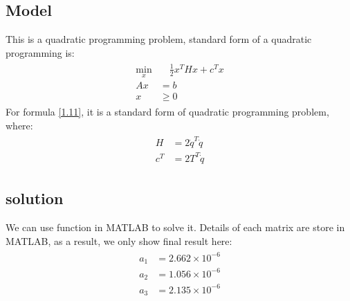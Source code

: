 \documentclass{article}
\begin{document}
    \subsection{Model}
        This is a quadratic programming problem, standard form of a quadratic programming is:
        \begin{align}
        \begin{split}
            \min_x &\quad \frac 12x^THx + c^Tx\\
            Ax &= b\\
            x &\geq 0
        \end{split}
        \end{align} 
        For formula \eqref{1.11}, it is a standard form of quadratic programming problem, where:
        \begin{align}
        \begin{split}\label{1.11}
            H &= 2 \dot{q}^T \dot{q}\\
            c^T &= 2T^T\dot{q}
        \end{split}
        \end{align} 
        
    \subsection{solution}    
        We can use function in MATLAB to solve it. Details of each matrix are store in MATLAB, as a result, we only show final result here:
        \begin{align}
        \begin{split}
           a_1 &= 2.662\times10^{-6}\\
           a_2 &= 1.056\times10^{-6}\\
           a_3 &= 2.135\times10^{-6}      
        \end{split}
        \end{align}     
        
\end{document}

